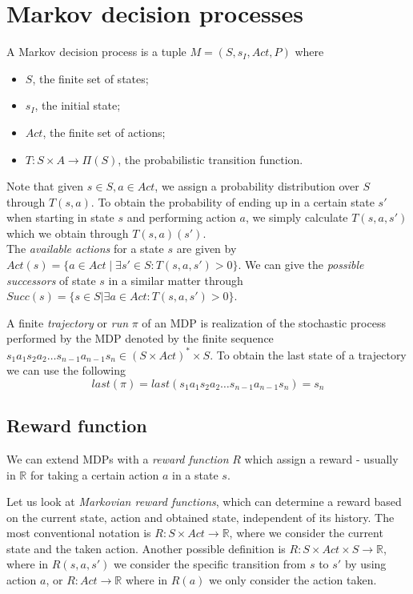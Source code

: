 \section*{Markov decision processes}

\begin{definition}[MDP]
	A Markov decision process is a tuple $M=(S,s_I,Act,P)$ where 
	\begin{itemize}
		\item $S$, the finite set of states;
		\item $s_I$, the initial state;
		\item $Act$, the finite set of actions;
		\item $T:S\times A\to \Pi(S)$, the probabilistic transition function.
	\end{itemize}
\end{definition}

Note that given $s\in S,a\in Act$, we assign a probability distribution over $S$ through $T(s,a)$. To obtain the probability of ending up in a certain state $s'$ when starting in state $s$ and performing action $a$, we simply calculate $T(s,a,s')$ which we obtain through $T(s,a)(s')$.\\

The \textit{available actions} for a state $s$ are given by $Act(s)=\{a\in Act\mid \exists s'\in S: T(s,a,s')>0\}$. We can give the \textit{possible successors} of state $s$ in a similar matter through $Succ(s)=\{s\in S|\exists a\in Act : T(s,a,s')>0\}$.

A finite \textit{trajectory} or \textit{run} $\pi$ of an MDP is realization of the stochastic process performed by the MDP denoted by the finite sequence $s_1 a_1 s_2 a_2\dots s_{n-1} a_{n-1} s_n \in (S\times Act)^*\times S$. To obtain the last state of a trajectory we can use the following \[last(\pi)=last(s_1 a_1 s_2 a_2\dots s_{n-1} a_{n-1} s_n)=s_n\]

\subsection*{Reward function}
We can extend MDPs with a \textit{reward function} $R$ which assign a reward - usually in $\mathbb{R}$ for taking a certain action $a$ in a state $s$. 


Let us look at \textit{Markovian reward functions}, which can determine a reward based on the current state, action and obtained state, independent of its history. The most conventional notation is $R:S\times Act\to \mathbb{R}$, where we consider the current state and the taken action. Another possible definition is $R:S\times Act\times S\to\mathbb{R}$, where  in $R(s,a,s')$ we consider the specific transition from $s$ to $s'$ by using action $a$, or $R:Act\to\mathbb{R}$ where in $R(a)$ we only consider the action taken. 

